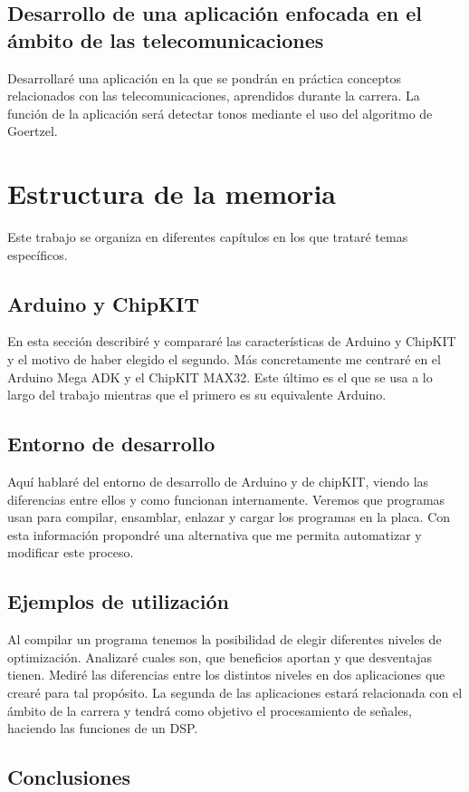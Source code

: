 \subsection{Desarrollo de una aplicación enfocada en el ámbito de las telecomunicaciones}
Desarrollaré una aplicación en la que se pondrán en práctica conceptos relacionados con las telecomunicaciones, aprendidos durante la carrera. La función de la aplicación será detectar tonos mediante el uso del algoritmo de Goertzel.

\section{Estructura de la memoria}
Este trabajo se organiza en diferentes capítulos en los que trataré temas específicos.

\subsection{Arduino y ChipKIT}
En esta sección describiré y compararé las características de Arduino y ChipKIT y el motivo de haber elegido el segundo. Más concretamente me centraré en el Arduino Mega ADK y el ChipKIT MAX32. Este último es el que se usa a lo largo del trabajo mientras que el primero es su equivalente Arduino.

\subsection{Entorno de desarrollo}
Aquí hablaré del entorno de desarrollo de Arduino y de chipKIT, viendo las diferencias entre ellos y como funcionan internamente. Veremos que programas usan para compilar, ensamblar, enlazar y cargar los programas en la placa. Con esta información propondré una alternativa que me permita automatizar y modificar este proceso.

\subsection{Ejemplos de utilización}
Al compilar un programa tenemos la posibilidad de elegir diferentes niveles de optimización. Analizaré cuales son, que beneficios aportan y que desventajas tienen. Mediré las diferencias entre los distintos niveles en dos aplicaciones que crearé para tal propósito. La segunda de las aplicaciones estará relacionada con el ámbito de la carrera y tendrá como objetivo el procesamiento de señales, haciendo las funciones de un DSP.

\subsection{Conclusiones}
